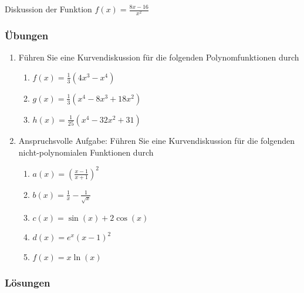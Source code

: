 \begin{example}
    Diskussion der Funktion $f(x) = \frac{8x-16}{x^2}$
\end{example}

\pagebreak


\pagebreak


\clearpage
\subsubsection{Übungen}
\begin{enumerate}
    \item
          Führen Sie eine Kurvendiskussion für die folgenden Polynomfunktionen durch
          \begin{enumerate}
              \item $f(x) = \frac{1}{3}\left(4x^3-x^4\right)$
              \item $g(x) = \frac{1}{3}\left(x^4-8x^3+18x^2\right)$
              \item $h(x) = \frac{1}{25}\left(x^4-32x^2+31\right)$
          \end{enumerate}
    \item Anspruchsvolle Aufgabe: Führen Sie eine Kurvendiskussion für die folgenden nicht-polynomialen Funktionen durch
          \begin{enumerate}
              \item $a(x) = \left(\frac{x-1}{x+1}\right)^2$
              \item $b(x) = \frac{1}{x} - \frac{1}{\sqrt x}$
              \item $c(x) = \sin(x) + 2\cos(x) $
              \item $d(x) = e^x (x-1)^2$
              \item $f(x) = x\ln(x)$
          \end{enumerate}
\end{enumerate}

\clearpage
\subsubsection*{Lösungen}

